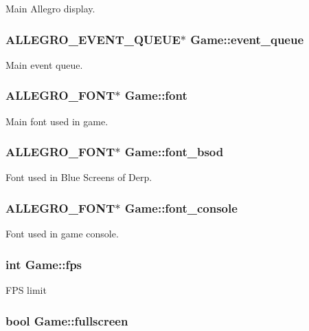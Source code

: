Main Allegro display. \hypertarget{structGame_a820782e408ff7a704dc12af67eb0c44f}{
\subsubsection[{event\+\_\+queue}]{\setlength{\rightskip}{0pt plus 5cm}A\+L\+L\+E\+G\+R\+O\+\_\+\+E\+V\+E\+N\+T\+\_\+\+Q\+U\+E\+U\+E$\ast$ Game\+::event\+\_\+queue}}\label{structGame_a820782e408ff7a704dc12af67eb0c44f}
Main event queue. \hypertarget{structGame_a455bfdaacd5f2bda80b640c02ec3250e}{
\subsubsection[{font}]{\setlength{\rightskip}{0pt plus 5cm}A\+L\+L\+E\+G\+R\+O\+\_\+\+F\+O\+N\+T$\ast$ Game\+::font}}\label{structGame_a455bfdaacd5f2bda80b640c02ec3250e}
Main font used in game. \hypertarget{structGame_a7d65ca9283d2c8ad178be068fe74c986}{
\subsubsection[{font\+\_\+bsod}]{\setlength{\rightskip}{0pt plus 5cm}A\+L\+L\+E\+G\+R\+O\+\_\+\+F\+O\+N\+T$\ast$ Game\+::font\+\_\+bsod}}\label{structGame_a7d65ca9283d2c8ad178be068fe74c986}
Font used in Blue Screens of Derp. \hypertarget{structGame_a692f2c3ec0f3e956aa8bdac00a864bf8}{
\subsubsection[{font\+\_\+console}]{\setlength{\rightskip}{0pt plus 5cm}A\+L\+L\+E\+G\+R\+O\+\_\+\+F\+O\+N\+T$\ast$ Game\+::font\+\_\+console}}\label{structGame_a692f2c3ec0f3e956aa8bdac00a864bf8}
Font used in game console. \hypertarget{structGame_a28534ff51b7b2adc76bdd8894a750d0d}{
\subsubsection[{fps}]{\setlength{\rightskip}{0pt plus 5cm}int Game\+::fps}}\label{structGame_a28534ff51b7b2adc76bdd8894a750d0d}
F\+P\+S limit \hypertarget{structGame_a026034417d95688ab99ba2e96e064b7f}{
\subsubsection[{fullscreen}]{\setlength{\rightskip}{0pt plus 5cm}bool Game\+::fullscreen}}\label{structGame_a026034417d95688ab99ba2e96e064b7f}
